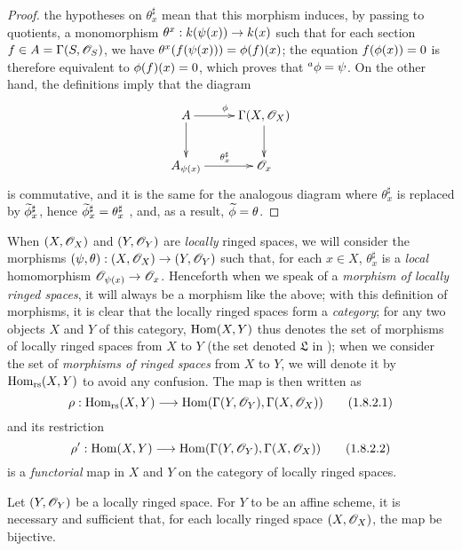 \begin{proof}
the hypotheses on $\theta_x^\sharp$ mean that this morphism induces, by passing to quotients, a monomorphism $\theta^x:\kres(\psi(x))\to\kres(x)$ such that for each section $f\in A=\Gamma(S,\mathscr{O}_S)$, we have $\theta^x(f(\psi(x)))=\phi(f)(x)$;
the equation $f(\phi(x))=0$ is therefore equivalent to $\phi(f)(x)=0$, which proves that ${}^a\phi=\psi$.
On the other hand, the definitions imply that the diagram
\[
  \xymatrix{
    A\ar[r]^\vphi\ar[d] &
    \Gamma(X,\sh{O}_X)\ar[d]\\
    A_{\psi(x)}\ar[r]^{\theta_x^\sharp} &
    \sh{O}_x
  }
\]
is commutative, and it is the same for the analogous diagram where $\theta_x^\sharp$ is replaced by $\widetilde{\phi}_x^\sharp$, hence $\widetilde{\phi}_x^\sharp=\theta_x^\sharp$ , and, as a result, $\widetilde{\phi}=\theta$.
\end{proof}

\begin{env}[1.8.2]
\label{1.1.8.2}
When $(X,\mathscr{O}_X)$ and $(Y,\mathscr{O}_Y)$ are \emph{locally} ringed spaces, we will consider the morphisms $(\psi,\theta):(X,\sh{O}_X)\to(Y,\sh{O}_Y)$ such that, for each $x\in X$, $\theta_x^\sharp$ is a \emph{local} homomorphism $\sh{O}_{\psi(x)}\to\sh{O}_x$.
Henceforth when we speak
of a \emph{morphism of locally ringed spaces}, it will always be a morphism like the above;
with this definition of morphisms, it is clear that the locally ringed spaces form a \emph{category};
for any two objects $X$ and $Y$ of this category, $\operatorname{Hom}(X,Y)$ thus denotes the set of morphisms of locally ringed spaces from $X$ to $Y$ (the set denoted $\mathfrak{L}$ in );
when we consider the set of \emph{morphisms of ringed spaces} from $X$ to $Y$, we will denote it by $\operatorname{Hom}_\text{rs}(X,Y)$ to avoid any confusion.
The map  is then written as
\[
  \label{1.1.8.2.1}
  \rho:\Hom_\text{rs}(X,Y)\to\Hom(\Gamma(Y,\sh{O}_Y),\Gamma(X,\sh{O}_X))
  \tag{1.8.2.1}
\]
and its restriction
\[
  \label{1.1.8.2.2}
  \rho':\Hom(X,Y)\to\Hom(\Gamma(Y,\sh{O}_Y),\Gamma(X,\sh{O}_X))
  \tag{1.8.2.2}
\]
is a \emph{functorial} map in $X$ and $Y$ on the category of locally ringed spaces.
\end{env}

\begin{corollary}[1.8.3]
\label{1.1.8.3}
Let $(Y,\mathscr{O}_Y)$ be a locally ringed space.
For $Y$ to be an affine scheme, it is necessary and sufficient that, for each locally ringed space $(X,\mathscr{O}_X)$, the map  be bijective.
\end{corollary}

